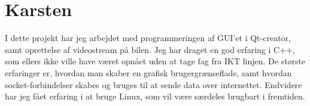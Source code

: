 \section{Karsten}
I dette projekt har jeg arbejdet med programmeringen af GUI'et i Qt-creator, samt oprettelse af videostream på bilen. 
Jeg har draget en god erfaring i C++, som ellers ikke ville have været opnået uden at tage fag fra IKT linjen. 
De største erfaringer er, hvordan man skaber en grafisk brugergrænseflade, samt hvordan socket-forbindelser skabes og bruges til at sende data over internettet. 
Endvidere har jeg fået erfaring i at bruge Linux, som vil være særdeles brugbart i fremtiden.  